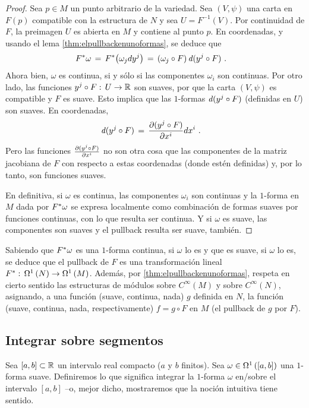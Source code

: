\begin{proof}
	Sea $p\in M$ un punto arbitrario de la variedad. Sea $(V,\psi)$
	una carta en $F(p)$ compatible con la estructura de $N$ y sea
	$U=F^{-1}(V)$. Por continuidad de $F$, la preimagen $U$ es abierta
	en $M$ y contiene al punto $p$. En coordenadas, y usando
	el lema \ref{thm:elpullbackenunoformas}, se deduce que
	\begin{align*}
		\pull{F}\omega & \,=\,\pull{F}\big(\omega_{j}\de{y^{j}}\big)
			\,=\,(\omega_{j}\circ F)\,\derext{(y^{j}\circ F)}
			\text{ .}
	\end{align*}
	Ahora bien, $\omega$ es continua, si y s\'{o}lo si las componentes
	$\omega_{i}$ son continuas. Por otro lado, las funciones
	$y^{j}\circ F:\,U\rightarrow\bb{R}$ son suaves, por que la carta
	$(V,\psi)$ es compatible y $F$ es suave. Esto implica que las
	$1$-formas $\derext{(y^{j}\circ F)}$ (definidas en $U$) son
	suaves. En coordenadas,
	\begin{align*}
		\derext{(y^{j}\circ F)} & \,=\,
			\derivada{(y^{j}\circ F)}{x^{i}}\de{x^{i}}
		\text{ .}
	\end{align*}
	Pero las funciones $\derivada{(y^{j}\circ F)}{x^{i}}$ no son otra
	cosa que las componentes de la matriz jacobiana de $F$ con respecto
	a estas coordenadas (donde est\'{e}n definidas) y, por lo tanto,
	son funciones suaves.
	
	En definitiva, si $\omega$ es continua, las componentes $\omega_{i}$
	son continuas y la $1$-forma en $M$ dada por
	$\pull{F}\omega$ se expresa localmente como combinaci\'{o}n
	de formas suaves por funciones continuas, con lo que resulta ser
	continua. Y si $\omega$ es suave, las componentes son suaves y
	el pullback resulta ser suave, tambi\'{e}n.
\end{proof}

Sabiendo que $\pull{F}\omega$ es una $1$-forma continua, si $\omega$ lo
es y que es suave, si $\omega$ lo es, se deduce que el pullback de $F$
es una transformaci\'{o}n lineal $\pull{F}:\,%
\formes[1]{N}\rightarrow\formes[1]{M}$. Adem\'{a}s, por
\ref{thm:elpullbackenunoformas}, respeta en cierto sentido las estructuras
de m\'{o}dulos sobre $C^{\infty}(M)$ y sobre $C^{\infty}(N)$, asignando, a
una funci\'{o}n (suave, continua, nada) $g$ definida en $N$, la funci\'{o}n
(suave, continua, nada, respectivamente) $f=g\circ F$ en $M$
(el pullback de $g$ por $F$).

\subsection{Integrar sobre segmentos}
Sea $[a,b]\subset\bb{R}$ un intervalo real compacto ($a$ y $b$ finitos).
Sea $\omega\in\formes[1]{[a,b]}$ una $1$-forma suave. Definiremos lo que
significa integrar la $1$-forma $\omega$ en/sobre el intervalo $[a,b]$ --o,
mejor dicho, mostraremos que la noci\'{o}n intuitiva tiene sentido.

